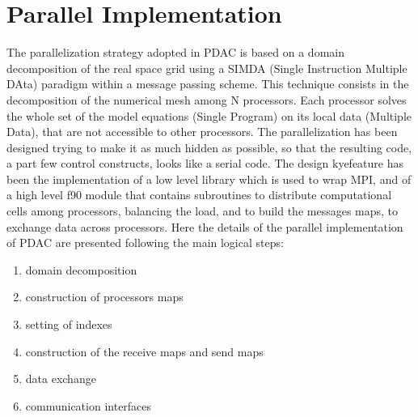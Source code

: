\section{Parallel Implementation}
%
The parallelization strategy adopted in PDAC is based on a domain decomposition
of the real space grid using a SIMDA (Single Instruction Multiple DAta) paradigm
within a message passing scheme. This technique consists in the decomposition
of the numerical mesh among N processors. Each processor solves the whole set of
the model equations (Single Program) on its local data (Multiple Data),
that are not accessible to other processors.
%
The parallelization has been designed trying to make it as much 
hidden as possible, so that the resulting code, a part few control constructs,
looks like a serial code. 
The design kyefeature has been the implementation of a low level library which is used
to wrap MPI, and of a high level f90 module that contains subroutines
to distribute computational cells among processors, balancing the load, and to build the 
messages maps, to exchange data across processors.  
Here the details of the parallel implementation of PDAC are
presented following the main logical steps:
\begin{enumerate}
\item domain decomposition
\item construction of processors maps
\item setting of indexes
\item construction of the receive maps and send maps
\item data exchange
\item communication interfaces
\end{enumerate}
% 
